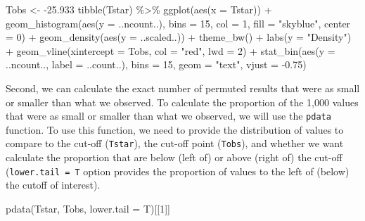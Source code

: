 \documentclass[
]{book}
\newenvironment{Shaded}{\begin{snugshade}}{\end{snugshade}}
\newcommand{\AttributeTok}[1]{\textcolor[rgb]{0.77,0.63,0.00}{#1}}
\newcommand{\DecValTok}[1]{\textcolor[rgb]{0.00,0.00,0.81}{#1}}
\newcommand{\FloatTok}[1]{\textcolor[rgb]{0.00,0.00,0.81}{#1}}
\newcommand{\FunctionTok}[1]{\textcolor[rgb]{0.00,0.00,0.00}{#1}}
\newcommand{\NormalTok}[1]{#1}
\newcommand{\OtherTok}[1]{\textcolor[rgb]{0.56,0.35,0.01}{#1}}
\newcommand{\SpecialCharTok}[1]{\textcolor[rgb]{0.00,0.00,0.00}{#1}}
\newcommand{\StringTok}[1]{\textcolor[rgb]{0.31,0.60,0.02}{#1}}
\begin{document}
\begin{Shaded}
\begin{Highlighting}[]
\NormalTok{Tobs }\OtherTok{\textless{}{-}} \SpecialCharTok{{-}}\FloatTok{25.933}
\FunctionTok{tibble}\NormalTok{(Tstar) }\SpecialCharTok{\%\textgreater{}\%} \FunctionTok{ggplot}\NormalTok{(}\FunctionTok{aes}\NormalTok{(}\AttributeTok{x =}\NormalTok{ Tstar)) }\SpecialCharTok{+} 
  \FunctionTok{geom\_histogram}\NormalTok{(}\FunctionTok{aes}\NormalTok{(}\AttributeTok{y =}\NormalTok{ ..ncount..), }\AttributeTok{bins =} \DecValTok{15}\NormalTok{, }\AttributeTok{col =} \DecValTok{1}\NormalTok{, }\AttributeTok{fill =} \StringTok{"skyblue"}\NormalTok{, }\AttributeTok{center =} \DecValTok{0}\NormalTok{) }\SpecialCharTok{+} 
  \FunctionTok{geom\_density}\NormalTok{(}\FunctionTok{aes}\NormalTok{(}\AttributeTok{y =}\NormalTok{ ..scaled..)) }\SpecialCharTok{+}
  \FunctionTok{theme\_bw}\NormalTok{() }\SpecialCharTok{+}
  \FunctionTok{labs}\NormalTok{(}\AttributeTok{y =} \StringTok{"Density"}\NormalTok{) }\SpecialCharTok{+}
  \FunctionTok{geom\_vline}\NormalTok{(}\AttributeTok{xintercept =}\NormalTok{ Tobs, }\AttributeTok{col =} \StringTok{"red"}\NormalTok{, }\AttributeTok{lwd =} \DecValTok{2}\NormalTok{) }\SpecialCharTok{+}
  \FunctionTok{stat\_bin}\NormalTok{(}\FunctionTok{aes}\NormalTok{(}\AttributeTok{y =}\NormalTok{ ..ncount.., }\AttributeTok{label =}\NormalTok{ ..count..), }\AttributeTok{bins =} \DecValTok{15}\NormalTok{, }\AttributeTok{geom =} \StringTok{"text"}\NormalTok{, }\AttributeTok{vjust =} \SpecialCharTok{{-}}\FloatTok{0.75}\NormalTok{)}
\end{Highlighting}
\end{Shaded}

\normalsize

\newpage

Second, we can calculate the exact number of permuted results that were as
small or smaller
than what we observed. To calculate the proportion of the 1,000 values that were
as small or smaller than what we observed, we will use the \texttt{pdata} function.
To use this
function, we need to provide the distribution of values to compare to the cut-off
(\texttt{Tstar}), the cut-off point (\texttt{Tobs}), and whether we want calculate the
proportion that are below (left of) or above (right of) the cut-off
(\texttt{lower.tail\ =\ T} option provides the proportion of values to the left of (below) the cutoff
of interest).

\begin{Shaded}
\begin{Highlighting}[]
\FunctionTok{pdata}\NormalTok{(Tstar, Tobs, }\AttributeTok{lower.tail =}\NormalTok{ T)[[}\DecValTok{1}\NormalTok{]]}
\end{Highlighting}
\end{Shaded}
\end{document}
